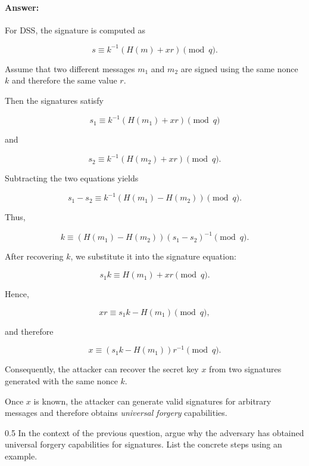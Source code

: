 \documentclass[]{scrartcl}
\newcounter{exercise}
\newcounter{qid}[section]
\newcommand{\exerciseprefix}{prefix}
\newcommand{\questiontitle}{Questions}
\newcommand{\blockid}{B4}
\newcommand{\exname}{}
\begin{document}
\paragraph{Answer:} {

For DSS, the signature is computed as

\[
s \equiv k^{-1}(H(m)+xr) \pmod q.
\]

Assume that two different messages $m_1$ and $m_2$ are signed using the same nonce $k$ and therefore the same value $r$.

Then the signatures satisfy

\[
s_1 \equiv k^{-1}(H(m_1)+xr) \pmod q
\]

and

\[
s_2 \equiv k^{-1}(H(m_2)+xr) \pmod q.
\]

Subtracting the two equations yields

\[
s_1-s_2
\equiv
k^{-1}(H(m_1)-H(m_2))
\pmod q.
\]

Thus,

\[
k
\equiv
(H(m_1)-H(m_2))
(s_1-s_2)^{-1}
\pmod q.
\]

After recovering $k$, we substitute it into the signature equation:

\[
s_1k
\equiv
H(m_1)+xr
\pmod q.
\]

Hence,

\[
xr
\equiv
s_1k-H(m_1)
\pmod q,
\]

and therefore

\[
x
\equiv
(s_1k-H(m_1))r^{-1}
\pmod q.
\]

Consequently, the attacker can recover the secret key $x$ from two signatures generated with the same nonce $k$.

Once $x$ is known, the attacker can generate valid signatures for arbitrary messages and therefore obtains \emph{universal forgery} capabilities.}

\renewcommand{\exerciseprefix}{PS-\blockid{}-E\theexercise: \exname{}-Q\theqid}
\renewcommand{\questiontitle}{\exerciseprefix{}: Attack on optimized operational use of DSS}
\begin{exercisebox}{0.5}
In the context of the previous question, argue why the adversary has obtained universal forgery capabilities for signatures. List the concrete steps using an example. 
\end{exercisebox}
\end{document}
